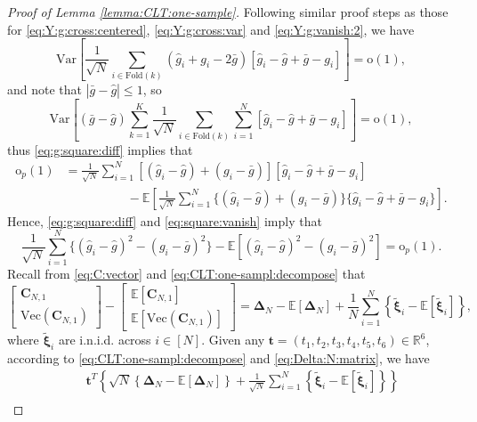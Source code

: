 \documentclass[12pt,letterpaper]{article}
\begin{document}
\begin{proof}[Proof of Lemma \ref{lemma:CLT:one-sample}]
Following similar proof steps as those for \eqref{eq:Y:g:cross:centered}, \eqref{eq:Y:g:cross:var} and \eqref{eq:Y:g:vanish:2}, we have 
$$\mathrm{Var}\left[\frac{1}{\sqrt{N}}\sum_{i\in\textrm{Fold}(k)}(\hat{g}_i+g_i-2\bar{g})[\hat{g}_i-\hat{g}+\bar{g}-g_i]\right]=\mathrm{o}(1),$$
and note that $|\bar{g}-\hat{g}|\leq1$, so 
$$\mathrm{Var}\left[(\bar{g}-\hat{g})\sum_{k=1}^K\frac{1}{\sqrt{N}}\sum_{i\in\textrm{Fold}(k)}\sum_{i=1}^N[\hat{g}_i-\hat{g}+\bar{g}-g_i]\right]=\mathrm{o}(1),$$
thus \eqref{eq:g:square:diff} implies that 
\begin{equation}\label{eq:square:vanish}
\begin{array}{rl}
\displaystyle\mathrm{o}_p(1)\!\!\!\!&\displaystyle=\frac{1}{\sqrt{N}}\sum_{i=1}^N[(\hat{g}_i-\hat{g})+(g_i-\bar{g})][\hat{g}_i-\hat{g}+\bar{g}-g_i]\\
&\quad\quad\quad\quad\quad\displaystyle-\mathbb{E}\left[\frac{1}{\sqrt{N}}\sum_{i=1}^N\{(\hat{g}_i-\hat{g})+(g_i-\bar{g})\}\{\hat{g}_i-\hat{g}+\bar{g}-g_i\}\right].
\end{array}
\end{equation}
Hence, \eqref{eq:g:square:diff} and \eqref{eq:square:vanish} imply that 
\begin{equation}\label{eq:square:CLT}
    \frac{1}{\sqrt{N}}\sum_{i=1}^N\{(\hat{g}_i-\hat{g})^2-(g_i-\bar{g})^2\}-\mathbb{E}\left[(\hat{g}_i-\hat{g})^2-(g_i-\bar{g})^2\right]=\mathrm{o}_p(1).
\end{equation}
Recall from \eqref{eq:C:vector} and \eqref{eq:CLT:one-sampl:decompose} that 
$$\begin{bmatrix}
\mathbf{C}_{N,1}\\
\mathrm{Vec}(\mathbf{C}_{N,1})
\end{bmatrix}-\begin{bmatrix}
\mathbb{E}[\mathbf{C}_{N,1}]\\
\mathbb{E}\left[\mathrm{Vec}(\mathbf{C}_{N,1})\right]
\end{bmatrix}=\mathbf{\Delta}_N-\mathbb{E}[\mathbf{\Delta}_N]+\frac{1}{N}\sum_{i=1}^N\left\{\tilde{\boldsymbol{\xi}}_i-\mathbb{E}[\tilde{\boldsymbol{\xi}}_i]\right\},$$
where $\tilde{\boldsymbol{\xi}}_i$ are i.n.i.d. across $i\in[N]$. Given any $\mathbf{t}=(t_1,t_2,t_3,t_4,t_5,t_6)\in\mathbb{R}^6$, according to \eqref{eq:CLT:one-sampl:decompose} and \eqref{eq:Delta:N:matrix}, we have
$$\begin{array}{rl}
&\quad\displaystyle\mathbf{t}^T\left\{\sqrt{N}\left\{\mathbf{\Delta}_N-\mathbb{E}[\mathbf{\Delta}_N]\right\}+\frac{1}{\sqrt{N}}\sum_{i=1}^N\left\{\tilde{\boldsymbol{\xi}}_i-\mathbb{E}[\tilde{\boldsymbol{\xi}}_i]\right\}\right\}\\

\end{array}$$
\end{proof}
\end{document}
